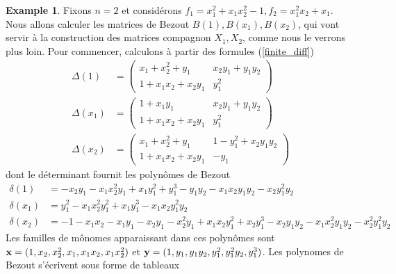\documentclass{article}
\theoremstyle{plain}%
\theoremstyle{definition}
\newtheorem{exmp}{Example}
\theoremstyle{remark}
\begin{document}
\begin{exmp}
\label{ex_bez_multi}
Fixons $n = 2$ et considérons $f_1 = x_1^2 + x_1x_2^2 - 1, f_2 = x_1^2x_2 + x_1$.
Nous allons calculer les matrices de Bezout $B(1), B(x_1), B(x_2)$,  qui vont servir à la construction des matrices compagnon $X_1, X_2$, comme nous le verrons plus loin. Pour commencer, calculons à partir des formules (\ref{finite_diff})
\begin{align}
\Delta(1) &=
\begin{pmatrix}
x_1 + x_2^2 + y_1 & x_2y_1 + y_1y_2 \\
1 + x_1x_2 + x_2y_1 & y_1^2
\end{pmatrix} \nonumber  \\
\Delta(x_1) &=
\begin{pmatrix}
1 + x_1y_1 & x_2y_1 + y_1y_2 \\
1 + x_1x_2 + x_2y_1 & y_1^2
\end{pmatrix} \nonumber  \\
\Delta(x_2) &=
\begin{pmatrix}
x_1 + x_2^2 + y_1 & 1 - y_1^2 + x_2y_1y_2 \\
1 + x_1x_2 + x_2y_1  & -y_1
\end{pmatrix} \nonumber
\end{align}
dont le déterminant fournit les polynômes de Bezout
\begin{align}
\delta(1) &= -x_2y_1 - x_1x_2^2y_1 + x_1y_1^2 + y_1^3 - y_1y_2 - x_1x_2y_1y_2 - x_2y_1^2y_2 \nonumber \\
\delta(x_1) &=  y_1^2 - x_1x_2^2y_1^2 + x_1y_1^3 - x_1x_2y_1^2y_2 \nonumber \\
\delta(x_2) &= -1 - x_1x_2 - x_1y_1 -x_2y_1 - x_2^2y_1 + x_1x_2y_1^2 + x_2y_1^3 - x_2y_1y_2 - x_1x_2^2y_1y_2 - x_2^2y_1^2y_2\nonumber
\end{align}
Les familles de mônomes apparaissant dans ces polynômes sont
$\bold{x} = (1, x_2, x_2^2, x_1, x_1x_2, x_1x_2^2)$ et $\bold{y} = (1, y_1, y_1y_2, y_1^2, y_1^2y_2, y_1^3)$.
Les polynomes de Bezout s'écrivent sous forme de tableaux\\


\end{exmp}
\end{document}
